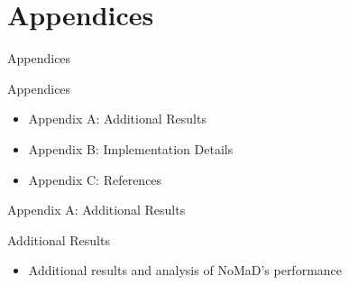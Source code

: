 \documentclass{beamer}
\begin{document}
\section{Appendices}
\begin{frame}{Appendices}
    \begin{block}{Appendices}
        \begin{itemize}
            \item Appendix A: Additional Results
            \item Appendix B: Implementation Details
            \item Appendix C: References
        \end{itemize}
    \end{block}
\end{frame}
\begin{frame}{Appendix A: Additional Results}
    \begin{block}{Additional Results}
        \begin{itemize}
            \item Additional results and analysis of NoMaD's performance
        \end{itemize}
    \end{block}
\end{frame}
\end{document}
